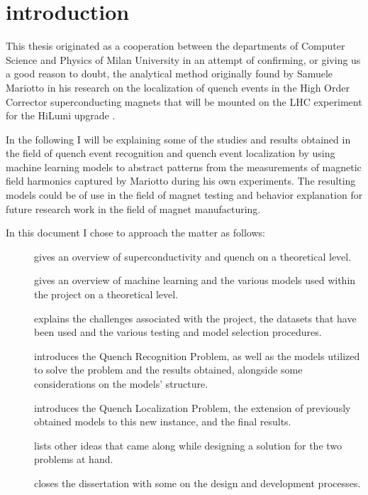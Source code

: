 \chapter{introduction}
This thesis originated as a cooperation between the departments of Computer Science and Physics of
Milan University in an attempt of confirming, or giving us a good reason to doubt, the analytical
method originally found by Samuele Mariotto in his research on the localization of quench events in
the High Order Corrector superconducting magnets that will be mounted on the LHC experiment for the
HiLumi upgrade \cite{mariotto2022} \cite{mariotto2022-generic}.

In the following I will be explaining some of the studies and results obtained in the field of
quench event recognition and quench event localization by using machine learning models to abstract
patterns from the measurements of magnetic field harmonics captured by Mariotto during his own
experiments. The resulting models could be of use in the field of magnet testing and behavior
explanation for future research work in the field of magnet manufacturing.

In this document I chose to approach the matter as follows:
\begin{description}
	\item[] gives an overview of superconductivity and quench on a
		theoretical level.
	\item[] gives an overview of machine learning and the various models used
		within the project on a theoretical level.
	\item[] explains the challenges associated with the project, the datasets
		that have been used and the various testing and model selection procedures.
	\item[] introduces the Quench Recognition Problem, as well as the models
		utilized to solve the problem and the results obtained, alongside some
		considerations on the models' structure.
	\item[] introduces the Quench Localization Problem, the extension of previously
		obtained models to this new instance, and the final results.
	\item[] lists other ideas that came along while designing a solution for
		the two problems at hand.
	\item[] closes the dissertation with some on the design and development
		processes.
\end{description}
